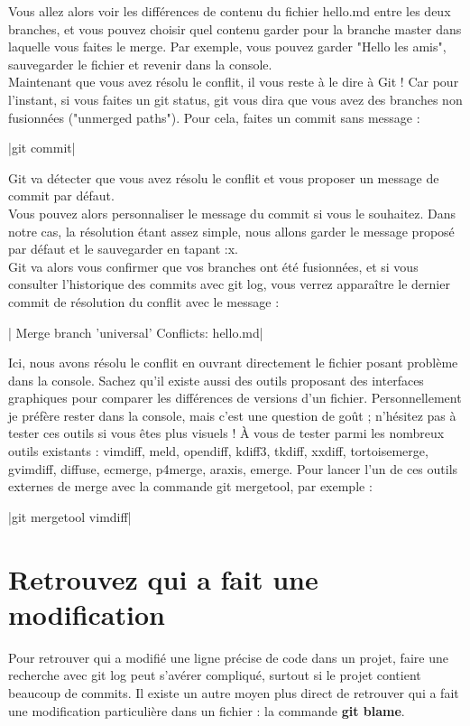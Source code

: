 Vous allez alors voir les différences de contenu du fichier hello.md entre les deux branches, et vous pouvez choisir quel contenu garder pour la branche master dans laquelle vous faites le merge. Par exemple, vous pouvez garder "Hello les amis", sauvegarder le fichier et revenir dans la console.\\

Maintenant que vous avez résolu le conflit, il vous reste à le dire à Git ! Car pour l'instant, si vous faites un git status, git vous dira que vous avez des branches non fusionnées ("unmerged paths"). Pour cela, faites un commit sans message : 

|git commit|

Git va détecter que vous avez résolu le conflit et vous proposer un message de commit par défaut.\\

Vous pouvez  alors personnaliser le message du commit si vous le souhaitez. Dans notre cas, la résolution étant assez simple, nous allons garder le message proposé par défaut et le sauvegarder en tapant :x. \\

Git va alors vous confirmer que vos branches ont été fusionnées, et si vous consulter l'historique des commits avec git log, vous verrez apparaître le dernier commit de résolution du conflit avec le message :

| Merge branch 'universal' Conflicts: hello.md|
       
Ici, nous avons résolu le conflit en ouvrant directement le fichier posant problème dans la console. Sachez qu'il existe aussi des outils proposant des interfaces graphiques pour comparer les différences de versions d'un fichier. Personnellement je préfère rester dans la console, mais c'est une question de goût ; n'hésitez pas à tester ces outils si vous êtes plus visuels ! À vous de tester parmi les nombreux outils existants : vimdiff, meld, opendiff, kdiff3, tkdiff, xxdiff, tortoisemerge, gvimdiff, diffuse, ecmerge, p4merge, araxis, emerge. Pour lancer l'un de ces outils externes de merge avec la commande git mergetool, par exemple : 

|git mergetool vimdiff|

\section{Retrouvez qui a fait une modification}
Pour retrouver qui a modifié une ligne précise de code dans un projet, faire une recherche avec git log peut s'avérer compliqué, surtout si le projet contient beaucoup de commits. Il existe un autre moyen plus direct de retrouver qui a fait une modification particulière dans un fichier : la commande \textbf{git blame}.

